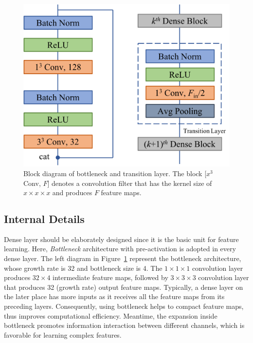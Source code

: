 \documentclass[10pt,twocolumn,letterpaper]{article}
\begin{document}
\begin{figure}[t]
\begin{center}
\includegraphics[scale=0.32]{fig/fig2.png}
\end{center}
\caption{Block diagram of bottleneck and transition layer. The block [$x^3$ Conv, $F$] denotes a convolution filter that has the kernel size of $x \times x \times x$ and produces $F$ feature maps.}
\label{fig:bottleneck}
\end{figure}


\subsection{Internal Details}

Dense layer should be elaborately designed since it is the basic unit for feature learning. 
Here, \emph{Bottleneck} architecture with pre-activation is adopted in every dense layer. 
The left diagram in Figure~\ref{fig:bottleneck} represent the bottleneck architecture, whose growth rate is 32 and bottleneck size is 4.
The $1 \times 1 \times 1$ convolution layer produces $32 \times 4$ intermediate feature maps, followed by $3 \times 3 \times 3$ convolution layer that produces 32 (growth rate) output feature maps.
Typically, a dense layer on the later place has more inputs as it receives all the feature maps from its preceding layers. 
Consequently, using bottleneck helps to compact feature maps, thus improves computational efficiency.
Meantime, the expansion inside bottleneck promotes information interaction between different channels, which is favorable for learning complex features.
\end{document}
